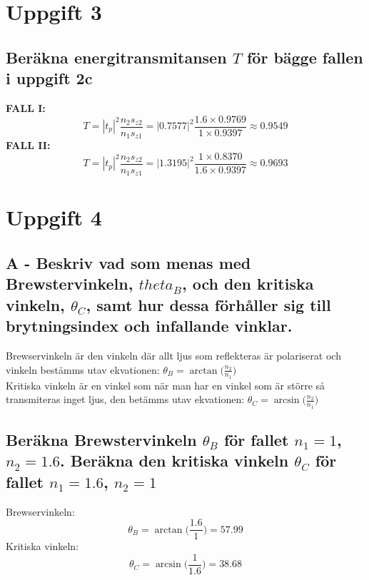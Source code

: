 \documentclass{article}
\begin{document}
\section*{Uppgift 3}
  \subsection*{Beräkna energitransmitansen $T$ för bägge fallen i uppgift 2c}
    \textbf{FALL I:}
    \[
      T=|t_p|^2\frac{n_2s_{z2}}{n_1s_{z1}}=|0.7577|^2\frac{1.6\times0.9769}{1\times0.9397}\approx0.9549
    \]
    \textbf{FALL II:}
    \[
      T=|t_p|^2\frac{n_2s_{z2}}{n_1s_{z1}}=|1.3195|^2\frac{1\times0.8370}{1.6\times0.9397}\approx0.9693
    \]

\newpage
\section*{Uppgift 4}
  \subsection*{A - Beskriv vad som menas med Brewstervinkeln, $theta_B$, och den kritiska vinkeln, $\theta_C$, samt hur dessa förhåller sig till brytningsindex och infallande vinklar.}
    Brewservinkeln är den vinkeln där allt ljus som reflekteras är polariserat och vinkeln bestämms utav ekvationen: $\theta_B=\arctan{\big(\frac{n_2}{n_1}\big)}$\\

    Kritiska vinkeln är en vinkel som när man har en vinkel som är större så transmiteras inget ljus, den betämms utav ekvationen: $\theta_C=\arcsin{\big(\frac{n_2}{n_1}\big)}$

  \subsection*{Beräkna Brewstervinkeln $\theta_B$ för fallet $n_1=1$, $n_2=1.6$. Beräkna den kritiska vinkeln $\theta_C$ för fallet $n_1=1.6$, $n_2=1$}
    Brewservinkeln:
    \[
      \theta_B=\arctan{\big(\frac{1.6}{1}\big)}=57.99
    \]
    Kritiska vinkeln:
    \[
      \theta_C=\arcsin{\big(\frac{1}{1.6}\big)}=38.68
    \]
\end{document}
